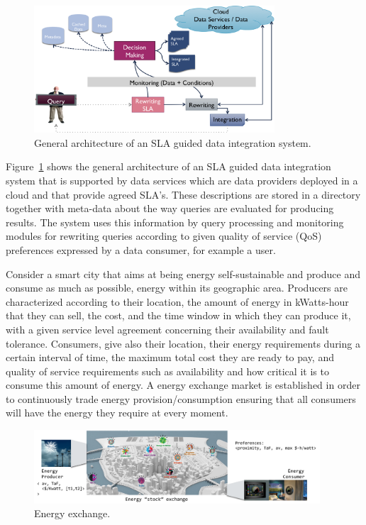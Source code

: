 \begin{figure}
\includegraphics[width=0.8\textwidth]{figs/arch.png}
\caption{General architecture of an SLA guided  data integration system.\label{fig:arch}}
\end{figure}

Figure~\ref{fig:arch} shows the general architecture of an SLA guided data integration system that is supported by data services which are data providers deployed in a cloud and that provide agreed SLA’s. 
These descriptions are stored in a directory together with meta-data about the way queries are evaluated for producing results. 
The system uses this information  by query processing and monitoring modules for rewriting queries according to given quality of service (QoS) preferences expressed by a data consumer, for example a user.


Consider a smart city that aims at being energy self-sustainable and produce and consume as much as possible, energy within its geographic area. 
Producers are characterized according to their location, the amount of energy in kWatts-hour that they can sell, the cost, and the time window in which they can produce it, with a given service level agreement concerning their availability and fault tolerance. 
Consumers, give also their location, their energy requirements during a certain interval of time, the maximum total cost they are ready to pay, and quality of service requirements such as availability and how critical it is to consume this amount of energy. 
A energy exchange market is established in order to continuously trade  energy provision/consumption ensuring that all consumers will have the energy they require at every moment.

\begin{figure}
\includegraphics[width=0.95\textwidth]{figs/exchange.pdf}
\caption{\label{fig:energyXChange} Energy exchange.}
\end{figure}

